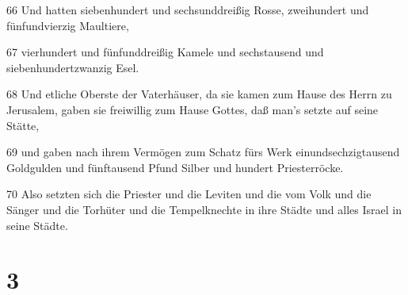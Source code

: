 \par 66 Und hatten siebenhundert und sechsunddreißig Rosse, zweihundert und fünfundvierzig Maultiere,
\par 67 vierhundert und fünfunddreißig Kamele und sechstausend und siebenhundertzwanzig Esel.
\par 68 Und etliche Oberste der Vaterhäuser, da sie kamen zum Hause des Herrn zu Jerusalem, gaben sie freiwillig zum Hause Gottes, daß man's setzte auf seine Stätte,
\par 69 und gaben nach ihrem Vermögen zum Schatz fürs Werk einundsechzigtausend Goldgulden und fünftausend Pfund Silber und hundert Priesterröcke.
\par 70 Also setzten sich die Priester und die Leviten und die vom Volk und die Sänger und die Torhüter und die Tempelknechte in ihre Städte und alles Israel in seine Städte.

\chapter{3}

